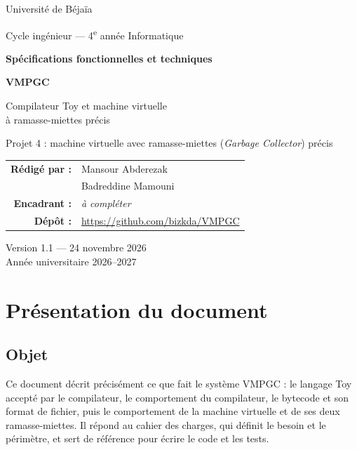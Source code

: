 \documentclass[11pt,a4paper]{article}
\newcommand{\encadrant}{\textit{à compléter}}
\begin{document}
\begin{titlepage}
\centering
{\large Université de Béjaïa\par}
\vspace{2mm}
{\normalsize Cycle ingénieur --- 4\textsuperscript{e} année Informatique\par}

\vspace{3cm}
{\Large\bfseries Spécifications fonctionnelles et techniques\par}
\vspace{6mm}
{\fontsize{34}{40}\selectfont\bfseries VMPGC\par}
\vspace{6mm}
{\large Compilateur Toy et machine virtuelle\\à ramasse-miettes précis\par}
\vspace{8mm}
{\normalsize Projet 4 : machine virtuelle avec ramasse-miettes (\emph{Garbage Collector}) précis\par}

\vfill
\begin{tabular}{rl}
  \textbf{Rédigé par :} & Mansour Abderezak \\
                        & Badreddine Mamouni \\[4mm]
  \textbf{Encadrant :}  & \encadrant \\[4mm]
  \textbf{Dépôt :}      & \url{https://github.com/bizkda/VMPGC} \\
\end{tabular}

\vspace{1.5cm}
Version 1.1 --- 24 novembre 2026\\
Année universitaire 2026--2027
\end{titlepage}

\tableofcontents
\newpage

\section{Présentation du document}

\subsection{Objet}
Ce document décrit précisément ce que fait le système VMPGC : le langage Toy accepté par le compilateur, le comportement du compilateur, le bytecode et son format de fichier, puis le comportement de la machine virtuelle et de ses deux ramasse-miettes. Il répond au cahier des charges, qui définit le besoin et le périmètre, et sert de référence pour écrire le code et les tests.
\end{document}
